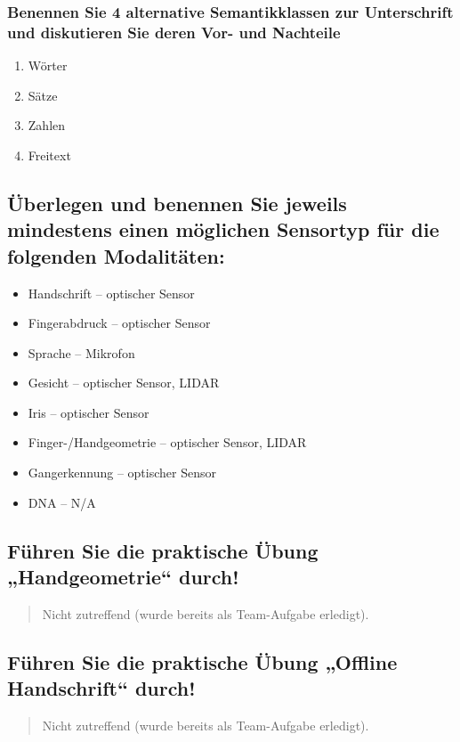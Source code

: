 \documentclass{article}
\newcommand{\annotation}[1]{
    \begin{quote}
    	\begin{textit}{#1}\end{textit}
    \end{quote}
}
\begin{document}
\subsubsection{Benennen Sie 4 alternative Semantikklassen zur Unterschrift und diskutieren Sie deren Vor- und Nachteile}

\begin{enumerate}
	\item Wörter
	\item Sätze
	\item Zahlen
	\item Freitext
\end{enumerate}

\subsection{Überlegen und benennen Sie jeweils mindestens einen möglichen Sensortyp für die folgenden Modalitäten:}

\begin{itemize}
	\item Handschrift – optischer Sensor
	\item Fingerabdruck – optischer Sensor
	\item Sprache – Mikrofon
	\item Gesicht – optischer Sensor, LIDAR
	\item Iris – optischer Sensor
	\item Finger-/Handgeometrie – optischer Sensor, LIDAR
	\item Gangerkennung – optischer Sensor
	\item DNA – N/A
\end{itemize}

\subsection{Führen Sie die praktische Übung „Handgeometrie“ durch!}

\annotation{Nicht zutreffend (wurde bereits als Team-Aufgabe erledigt).}

\subsection{Führen Sie die praktische Übung „Offline Handschrift“ durch!}

\annotation{Nicht zutreffend (wurde bereits als Team-Aufgabe erledigt).}

\newpage

\section{}
\end{document}
